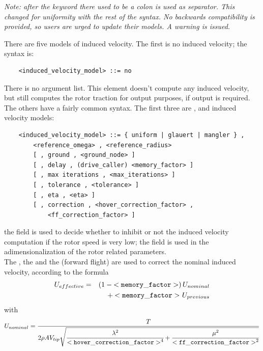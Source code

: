 \emph{Note: after the keyword  there used to be
a colon is used as separator.
This changed for uniformity with the rest of the syntax.
No backwards compatibility is provided, so users are urged to update
their models.
A warning is issued.
}

\noindent
There are five models of induced velocity. 
The first is no induced velocity; the syntax is:
\begin{verbatim}
    <induced_velocity_model> ::= no
\end{verbatim}
There is no argument list. This element doesn't compute any induced
velocity, but still computes the rotor traction for output purposes,
if output is required.
The others have a fairly common syntax.  The first three are
,  and  induced velocity
models:
\begin{verbatim}
    <induced_velocity_model> ::= { uniform | glauert | mangler } , 
        <reference_omega> , <reference_radius> 
        [ , ground , <ground_node> ]
        [ , delay , (drive_caller) <memory_factor> ]
        [ , max iterations , <max_iterations> ]
        [ , tolerance , <tolerance> ]
        [ , eta , <eta> ]
        [ , correction , <hover_correction_factor> ,
            <ff_correction_factor> ]
\end{verbatim}
the  field is used to decide whether to inhibit
or not the induced velocity computation if the rotor speed is very low;
the  field is used in the adimensionalization
of the rotor related parameters. \\
The , the  
and the  (forward flight) are
used to correct the nominal induced velocity, according to the formula
\begin{eqnarray*}
	U_{effective} & = &
	\left( 1 - \mathtt{<memory\_factor>} \right) 
		U_{nominal} \\
	& & \mbox{} + \mathtt{<memory\_factor>} \ U_{previous}
\end{eqnarray*}
with
\begin{displaymath}
	U_{nominal} = \frac{T}{2 \rho A V_{tip} \sqrt{
		\cfrac{\lambda^2}{\mathtt{<hover\_correction\_factor>}^4}
		+ \cfrac{\mu^2}{\mathtt{<ff\_correction\_factor>}^2}
	}}
\end{displaymath}
